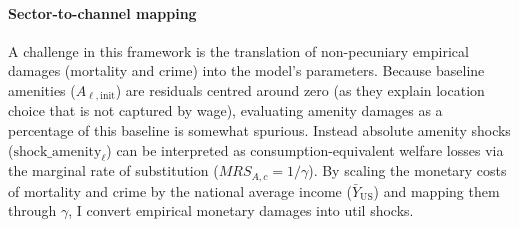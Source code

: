 \documentclass[12pt, a4paper]{article}
\begin{document}
\paragraph{Sector-to-channel mapping}
A challenge in this framework is the translation of non-pecuniary empirical damages (mortality and crime) into the model's parameters. Because baseline amenities ($A_{\ell, \text{init}}$) are residuals centred around zero (as they explain location choice that is not captured by wage), evaluating amenity damages as a percentage of this baseline is somewhat spurious. Instead absolute amenity shocks ($\text{shock\_amenity}_\ell$) can be interpreted as consumption-equivalent welfare losses via the marginal rate of substitution ($MRS_{A,c} = 1/\gamma$). By scaling the monetary costs of mortality and crime by the national average income ($\bar{Y}_{\text{US}}$) and mapping them through $\gamma$, I convert empirical monetary damages into util shocks.
\end{document}
